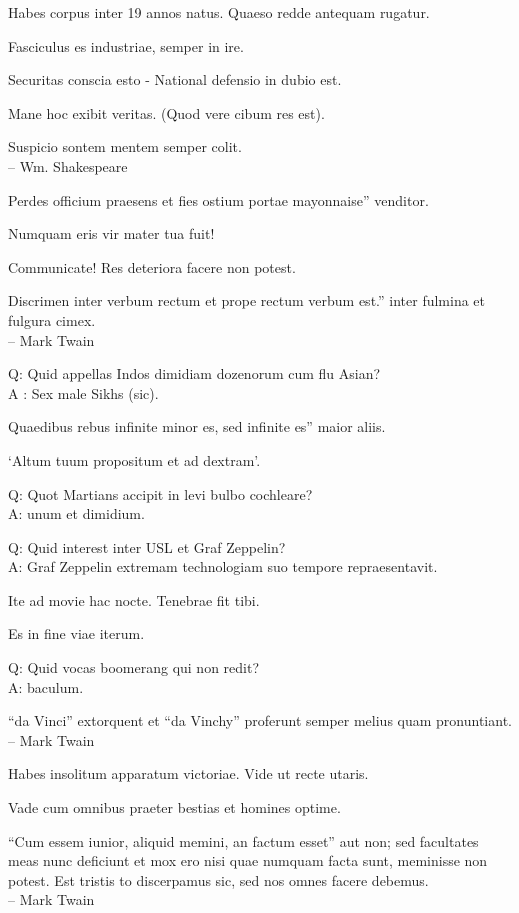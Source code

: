 \documentclass[titlepage,12pt]{memoir}
\begin{document}
Habes corpus inter 19 annos natus. Quaeso redde antequam rugatur.

Fasciculus es industriae, semper in ire.

Securitas conscia esto - National defensio in dubio est.

Mane hoc exibit veritas. (Quod vere cibum res est).

Suspicio sontem mentem semper colit.
\\-- Wm. Shakespeare

Perdes officium praesens et fies ostium portae mayonnaise”
venditor.

Numquam eris vir mater tua fuit!

Communicate! Res deteriora facere non potest.

Discrimen inter verbum rectum et prope rectum verbum est.”
inter fulmina et fulgura cimex.
\\-- Mark Twain

Q: Quid appellas Indos dimidiam dozenorum cum flu Asian?\\
A : Sex male Sikhs (sic).

Quaedibus rebus infinite minor es, sed infinite es”
maior aliis.

‘Altum tuum propositum et ad dextram’.

Q: Quot Martians accipit in levi bulbo cochleare?\\
A: unum et dimidium.

Q: Quid interest inter USL et Graf Zeppelin?\\
A: Graf Zeppelin extremam technologiam suo tempore repraesentavit.

Ite ad movie hac nocte. Tenebrae fit tibi.

Es in fine viae iterum.

Q: Quid vocas boomerang qui non redit?\\
A: baculum.

“da Vinci” extorquent et “da Vinchy” proferunt
semper melius quam pronuntiant.
\\-- Mark Twain

Habes insolitum apparatum victoriae. Vide ut recte utaris.

Vade cum omnibus praeter bestias et homines optime.

“Cum essem iunior, aliquid memini, an factum esset”
aut non; sed facultates meas nunc deficiunt et mox ero
nisi quae numquam facta sunt, meminisse non potest. Est tristis to
discerpamus sic, sed nos omnes facere debemus.
\\-- Mark Twain
\end{document}
